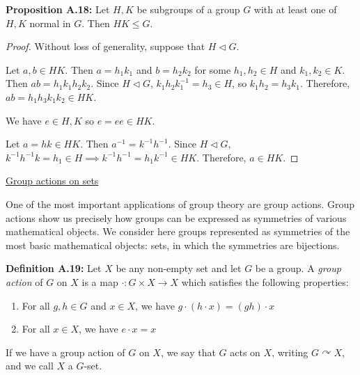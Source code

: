 \documentclass[12pt]{article}
\newcommand{\vs}{\vskip10pt}
\begin{document}
	\vs 
	
	\textbf{Proposition A.18: } Let $H,K$ be subgroups of a group $G$ with at least one of $H,K$ normal in $G$. Then $HK \leq G$. 
	
	\begin{proof}
		
		Without loss of generality, suppose that $H \triangleleft G$.
		
		\vs
		
		Let $a,b \in HK$. Then $a = h_1 k_1$ and $b = h_2 k_2$ for some $h_1, h_2 \in H$ and $k_1, k_2 \in K$. Then $ab = h_1 k_1 h_2 k_2$. Since $H \triangleleft G$, $k_1 h_2 k_1^{-1} = h_3 \in H$, so $k_1 h_2 = h_3 k_1$. Therefore, $ab = h_1 h_3 k_1 k_2 \in HK$. 
		
		\vs 
		
		We have $e \in H,K$ so $e = ee \in HK$.
		
		\vs 
		
		Let $a = hk \in HK$. Then $a^{-1} = k^{-1}h^{-1}$. Since $H \triangleleft G$, $k^{-1} h^{-1} k = h_1 \in H \implies k^{-1} h^{-1} = h_1 k^{-1} \in HK$. Therefore, $a \in HK$.
		
	\end{proof}
	
	\underline{Group actions on sets}
	
	\vs 
	
	One of the most important applications of group theory are group actions. Group actions show us precisely how groups can be expressed as symmetries of various mathematical objects. We consider here groups represented as symmetries of the most basic mathematical objects: sets, in which the symmetries are bijections. 
	\vs 
	
	\textbf{Definition A.19: } Let $X$ be any non-empty set and let $G$ be a group. A \textit{group action} of $G$ on $X$ is a map $\cdot: G \times X \rightarrow X$ which satisfies the following properties: 
	
	\begin{enumerate}[label = (\roman*)]
		\item For all $g,h \in G$ and $x \in X$, we have $g \cdot (h \cdot x) = (gh) \cdot x$
		\item For all $x \in X$, we have $e \cdot x = x$
	\end{enumerate}
	
	If we have a group action of $G$ on $X$, we say that $G$ acts on $X$, writing $G \curvearrowright X$, and we call $X$ a $G$-set. 
	
	\vs 
	
\end{document}
